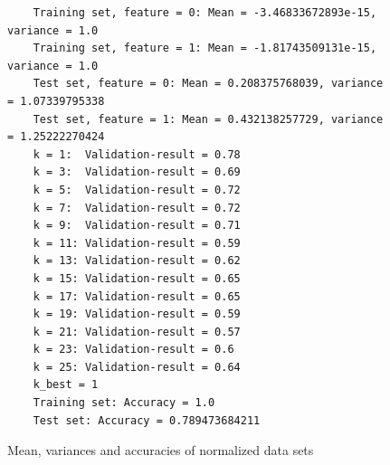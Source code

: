 \documentclass[a4paper]{article}
\begin{document}
\begin{figure}[H]
	\begin{lstlisting}
	Training set, feature = 0: Mean = -3.46833672893e-15, variance = 1.0
	Training set, feature = 1: Mean = -1.81743509131e-15, variance = 1.0
	Test set, feature = 0: Mean = 0.208375768039, variance = 1.07339795338
	Test set, feature = 1: Mean = 0.432138257729, variance = 1.25222270424
	k = 1:  Validation-result = 0.78
	k = 3:  Validation-result = 0.69
	k = 5:  Validation-result = 0.72
	k = 7:  Validation-result = 0.72
	k = 9:  Validation-result = 0.71
	k = 11: Validation-result = 0.59
	k = 13: Validation-result = 0.62
	k = 15: Validation-result = 0.65
	k = 17: Validation-result = 0.65
	k = 19: Validation-result = 0.59
	k = 21: Validation-result = 0.57
	k = 23: Validation-result = 0.6
	k = 25: Validation-result = 0.64
	k_best = 1
	Training set: Accuracy = 1.0
	Test set: Accuracy = 0.789473684211
	\end{lstlisting}
	\caption{Mean, variances and accuracies of normalized data sets}
	\label{fig:normalization_results}
\end{figure}
\end{document}
